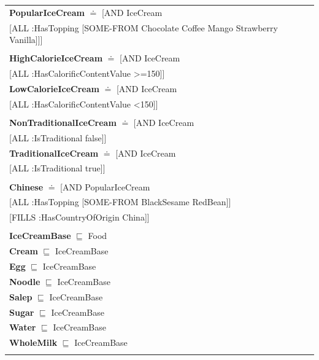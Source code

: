 \documentclass[12pt]{article}
\newcommand*{\MyIndent}{\hspace*{7em}}
\begin{document}
\begin{tabularx}{1\textwidth}{@{}X@{}}
            \textbf{PopularIceCream} $\doteq$ [AND IceCream \\
                                                  \MyIndent [ALL :HasTopping [SOME-FROM Chocolate Coffee Mango Strawberry Vanilla]]] \\
                                                  \tabularnewline
            
            \textbf{HighCalorieIceCream} $\doteq$ [AND IceCream \\
                                             \MyIndent \MyIndent [ALL :HasCalorificContentValue >=150]] \\
            \textbf{LowCalorieIceCream} $\doteq$ [AND IceCream \\
                                             \MyIndent \MyIndent [ALL :HasCalorificContentValue <150]] \\
                                             \tabularnewline
                                             
            \textbf{NonTraditionalIceCream} $\doteq$ [AND IceCream \\
                                             \MyIndent \MyIndent [ALL :IsTraditional false]] \\
            \textbf{TraditionalIceCream} $\doteq$ [AND IceCream \\
                                             \MyIndent \MyIndent [ALL :IsTraditional true]] \\
                                             \tabularnewline
            
            \textbf{Chinese} $\doteq$ [AND PopularIceCream \\
                                                  \MyIndent [ALL :HasTopping [SOME-FROM BlackSesame RedBean]] \\
                                                  \MyIndent [FILLS :HasCountryOfOrigin China]] \\
                                                  \tabularnewline

            
            \textbf{IceCreamBase} $\sqsubseteq$ Food \\
                \textbf{Cream} $\sqsubseteq$ IceCreamBase \\
                \textbf{Egg} $\sqsubseteq$ IceCreamBase \\
                \textbf{Noodle} $\sqsubseteq$ IceCreamBase \\
                \textbf{Salep} $\sqsubseteq$ IceCreamBase \\
                \textbf{Sugar} $\sqsubseteq$ IceCreamBase \\
                \textbf{Water} $\sqsubseteq$ IceCreamBase \\
                \textbf{WholeMilk} $\sqsubseteq$ IceCreamBase \\ \tabularnewline
            

\end{tabularx}
\end{document}
